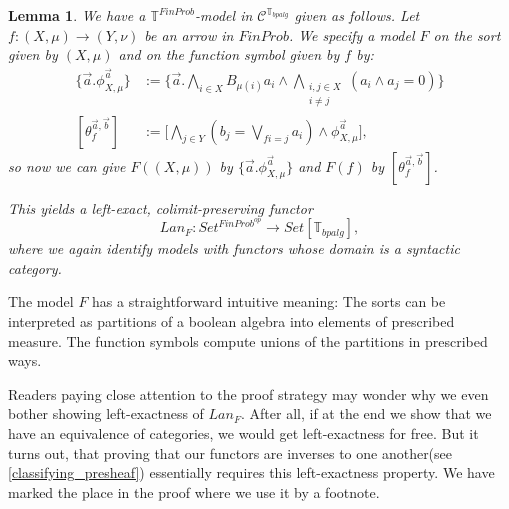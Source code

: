 \documentclass[a4paper]{amsproc}
\theoremstyle{plain}
\newtheorem{lemma}[theorem]{Lemma}
\theoremstyle{definition}
\theoremstyle{remark}
\numberwithin{equation}{section}
\begin{document}
\begin{lemma} \label{inverse}
We have a $\mathbb{T}^{FinProb}$-model in $\mathcal{C}^{\mathbb{T}_{bpalg}}$ given as follows. Let $f: (X,\mu) \to (Y, \nu)$ be an arrow in $FinProb$. We specify a model $F$ on the sort given by $(X,\mu)$ and on the function symbol given by $f$ by:
\begin{align*}
\{\vec{a} . \phi_{X,\mu}^{\vec{a}}\} &:= \Bigg \{ \vec{a} . \bigwedge_{i \in X} B_{\mu(i)} a_i \wedge \bigwedge_{\substack{i,j \in X \\ i \neq j}} (a_i \wedge a_j = 0) \Bigg \} \\
[\theta_f^{\vec{a}, \vec{b}}] &:= \Bigg [ \bigwedge_{j \in Y} (b_j = \bigvee_{f i = j} a_i) \wedge \phi_{X,\mu}^{\vec{a}} \Bigg] ,
\end{align*}
so now we can give $F((X,\mu))$ by $\{\vec{a} . \phi_{X,\mu}^{\vec{a}}\}$ and $F(f)$ by $[\theta_f^{\vec{a}, \vec{b}}]$.

This yields a left-exact, colimit-preserving functor 
\[
    Lan_F: Set^{FinProb^{op}} \to Set[\mathbb{T}_{bpalg}],
\]
where we again identify models with functors whose domain is a syntactic category.
\end{lemma}

The model $F$ has a straightforward intuitive meaning: The sorts can be interpreted as partitions of a boolean algebra into elements of prescribed measure. The function symbols compute unions of the partitions in prescribed ways.

Readers paying close attention to the proof strategy may wonder why we even bother showing left-exactness of $Lan_F$. After all, if at the end we show that we have an equivalence of categories, we would get left-exactness for free. But it turns out, that proving that our functors are inverses to one another(see \ref{classifying_presheaf}) essentially requires this left-exactness property. We have marked the place in the proof where we use it by a footnote.
\end{document}
